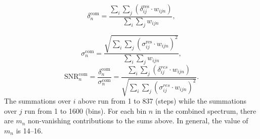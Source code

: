 \begin{equation}
    \label{eq:comb_power}
    \delta_{n}^\text{com} = \frac{\sum\limits_{i}\sum\limits_{j}\left(\delta_{ij}^\text{res} \cdot {w_{ijn}}\right)}{\sum\limits_{i}\sum\limits_{j} {w_{ijn}}},
\end{equation}

\begin{equation}
    \label{eq:comb_sigma}
    \sigma_{n}^\text{com} = \frac{ \sqrt{\sum\limits_{i}\sum\limits_{j}(\sigma_{ij}^\text{res} \cdot {w_{ijn}})^2}}{\sum\limits_{i}\sum\limits_{j} {w_{ijn}}},
\end{equation}
\begin{equation}
    \label{eq:comb_snr}
    \text{SNR}_{n}^\text{com} = \frac{\delta^\text{com}_{n}}{\sigma^\text{com}_{n}}= \frac{\sum\limits_{i}\sum\limits_{j}\left(\delta_{ij}^{res} \cdot {w_{ijn}}\right)}{ \sqrt{\sum\limits_{i}\sum\limits_{j}(\sigma_{ij}^{res} \cdot {w_{ijn}})^2}}.
\end{equation} 
The summations over $i$ above run from 1 to 837 (steps) while the summations 
over $j$ run from 1 to 1600 (bins).  
For each bin $n$ in the combined spectrum, there are $m_n$ non-vanishing 
contributions to the sums above. In general, the value of $m_n$ is 14--16.



